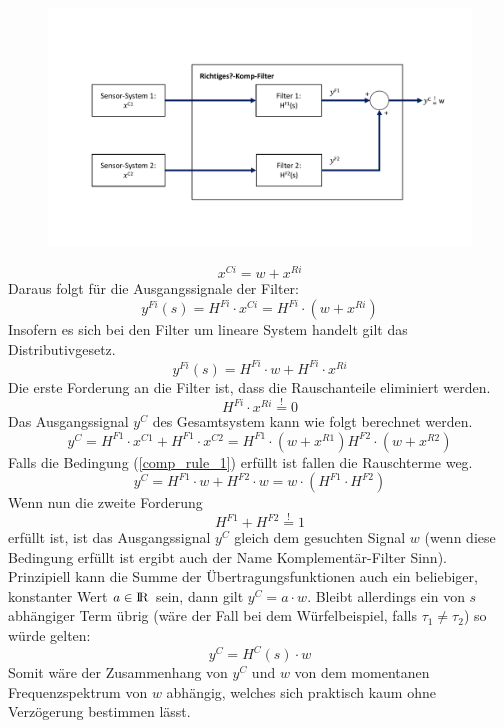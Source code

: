 \documentclass{article}
\begin{document}
\begin{figure}[!h]
\includegraphics[scale=0.5,trim={0 3cm 0 4cm},clip]{Allg_Komp}
\end{figure}

\begin{equation}
x^{Ci} = w + x^{Ri} 
\end{equation}
Daraus folgt für die Ausgangssignale der Filter:
\begin{equation}
y^{Fi}(s) = H^{Fi} \cdot x^{Ci} = H^{Fi} \cdot (w + x^{Ri}) 
\end{equation}
Insofern es sich bei den Filter um lineare System handelt gilt das Distributivgesetz.
\begin{equation}
y^{Fi}(s) = H^{Fi} \cdot w + H^{Fi} \cdot x^{Ri} 
\end{equation}
Die erste Forderung an die Filter ist, dass die Rauschanteile eliminiert werden.
\begin{equation}
\label{comp_rule_1}
H^{Fi} \cdot x^{Ri} \overset{!}{=} 0
\end{equation}
Das Ausgangssignal $y^C$ des Gesamtsystem kann wie folgt berechnet werden.
\begin{equation}
y^C = H^{F1} \cdot x^{C1} + H^{F1} \cdot x^{C2} = H^{F1} \cdot (w + x^{R1}) H^{F2} \cdot (w + x^{R2})
\end{equation}
Falls die Bedingung (\ref{comp_rule_1}) erfüllt ist fallen die Rauschterme weg.
\begin{equation}
y^C = H^{F1} \cdot w + H^{F2} \cdot w = w \cdot (H^{F1} \cdot H^{F2})
\end{equation}
Wenn nun die zweite Forderung 
\begin{equation}
\label{comp_rule_2}
H^{F1} + H^{F2} \overset{!}{=} 1
\end{equation}
erfüllt ist, ist das Ausgangssignal $y^C$ gleich dem gesuchten Signal $w$ (wenn diese Bedingung erfüllt ist ergibt auch der Name Komplementär-Filter Sinn). Prinzipiell kann die Summe der Übertragungsfunktionen auch ein beliebiger, konstanter Wert $a \in \rm I\!R$ sein, dann gilt $y^C = a \cdot w$. Bleibt allerdings ein von $s$ abhängiger Term übrig (wäre der Fall bei dem Würfelbeispiel, falls $\tau_1 \neq \tau_2$) so würde gelten:
\begin{equation}
y^C = H^C(s) \cdot w
\end{equation}
Somit wäre der Zusammenhang von $y^C$ und $w$ von dem momentanen Frequenzspektrum von $w$ abhängig, welches sich praktisch kaum ohne Verzögerung bestimmen lässt.
\end{document}
